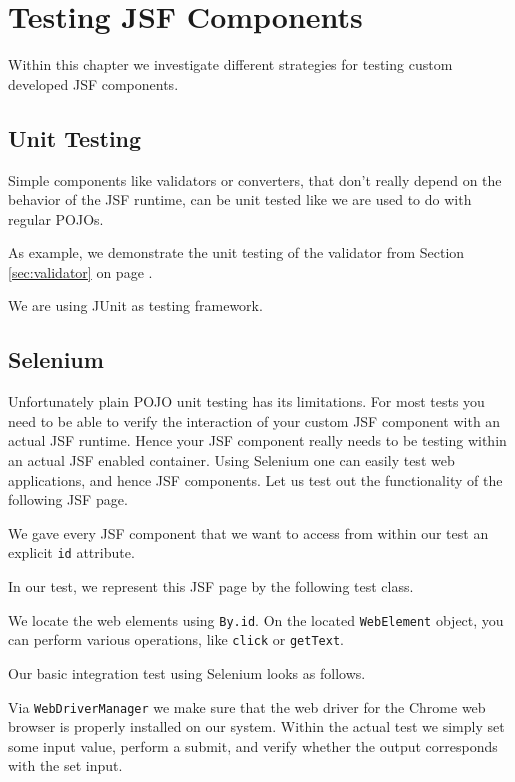 %

\chapter{Testing JSF Components}
Within this chapter we investigate different strategies for testing custom developed JSF components.

\section{Unit Testing}
Simple components like validators or converters, that don't really depend on the behavior of the JSF runtime, can be unit tested like we are used to do with regular POJOs.

As example, we demonstrate the unit testing of the validator from Section \ref{sec:validator}  on page \pageref{sec:validator}.

We are using JUnit \cite{junit5} as testing framework.


\section{Selenium}
Unfortunately plain POJO unit testing has its limitations.
For most tests you  need to be able to verify the interaction of your custom JSF component with an actual JSF runtime.
Hence your JSF component really needs to be testing within an actual JSF enabled container.
Using Selenium \cite{selenium} one can easily test web applications, and hence JSF components.
Let us test out the functionality of the following JSF page.

We gave every JSF component that we want to access from within our test an explicit \texttt{id} attribute.

In our test, we represent this JSF page by the following test class.

We locate the web elements using \texttt{By.id}.
On the located \texttt{WebElement} object, you can perform various operations, like \texttt{click} or \texttt{getText}.

Our basic integration test using Selenium looks as follows.

Via \texttt{WebDriverManager} we make sure that the web driver \cite{webdriver} for the Chrome web browser is properly installed on our system.
Within the actual test we simply set some input value, perform a submit, and verify whether the output corresponds with the set input.

